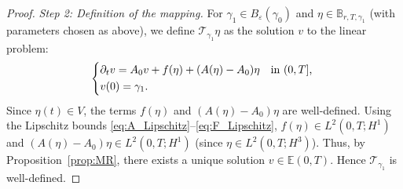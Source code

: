\documentclass{article}
\theoremstyle{remark}
\theoremstyle{definition}
\numberwithin{equation}{section}
\begin{document}
\begin{proof}
    \textit{Step 2: Definition of the mapping.}
    For $\gamma_1 \in B_\varepsilon(\gamma_0)$ and $\eta \in \mathbb{B}_{r,T,\gamma_1}$ (with parameters chosen as above), we define $\mathcal{T}_{\gamma_1}\eta$ as the solution $v$ to the linear problem:
    \begin{equation}
        \begin{dcases*}
            \partial_t v = A_0 v + f(\eta) + (A(\eta) - A_0)\eta & in $(0,T]$, \\
            v(0) = \gamma_1.
        \end{dcases*}
        \label{eq:sub-prob}
    \end{equation}
    Since $\eta(t) \in V$, the terms $f(\eta)$ and $(A(\eta)-A_0)\eta$ are well-defined.
    Using the Lipschitz bounds \eqref{eq:A_Lipschitz}--\eqref{eq:F_Lipschitz}, $f(\eta) \in L^2(0,T;H^1)$ and $(A(\eta)-A_0)\eta \in L^2(0,T;H^1)$ (since $\eta \in L^2(0,T;H^3)$).
    Thus, by Proposition~\ref{prop:MR}, there exists a unique solution $v \in \mathbb{E}(0,T)$. Hence $\mathcal{T}_{\gamma_1}$ is well-defined.


\end{proof}
\end{document}
